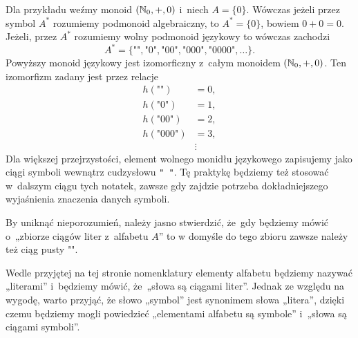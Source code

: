 \documentclass[a4paper,11pt]{article}
\begin{document}
Dla przykładu weźmy monoid $( \mathbb{N}_{ 0 }, +, 0)$ i~niech $A = \{ 0 \}$. Wówczas
jeżeli przez symbol $A^{ * }$ rozumiemy podmonoid algebraiczny, to $A^{ * } =
\{ 0 \}$, bowiem $0 + 0 = 0$. Jeżeli, przez $A^{ * }$ rozumiemy wolny podmonoid
językowy to wówczas zachodzi
\begin{equation}
  \label{eq:Forys-Forys-09}
  A^{ * } = \{ \textrm{""}, \textrm{"} 0 \textrm{"},
  \textrm{"} 00 \textrm{"}, \textrm{"} 000 \textrm{"},
  \textrm{"} 0000 \textrm{"}, \ldots \}.
\end{equation}
Powyższy monoid językowy jest izomorficzny z~całym monoidem
$( \mathbb{N}_{ 0 }, +, 0)$. Ten izomorfizm zadany jest przez relacje
\begin{subequations}
  \begin{align}
    \label{eq:Forys-Forys-10-A}
    h( \textrm{""} ) &= 0, \\
    h( \textrm{"} 0 \textrm{"} ) &= 1, \\
    h( \textrm{"} 0 0 \textrm{"} ) &= 2, \\
    h( \textrm{"} 0 0 0 \textrm{"} ) &= 3, \\
    &\vdots
  \end{align}
\end{subequations}
Dla większej przejrzystości, element wolnego monidłu językowego zapisujemy
jako ciągi symboli wewnątrz cudzysłowu \texttt{" "}. Tę praktykę będziemy
też stosować w~dalszym ciągu tych notatek, zawsze gdy zajdzie potrzeba
dokładniejszego wyjaśnienia znaczenia danych symboli.

\vspace{\spaceFour}



\start {} By uniknąć nieporozumień, należy jasno stwierdzić, że~gdy
będziemy mówić o~„zbiorze ciągów liter z~alfabetu $A$” to w domyśle do tego
zbioru zawsze należy też ciąg pusty \textrm{""}.

\vspace{\spaceFour}



\start {} Wedle przyjętej na tej stronie nomenklatury elementy
alfabetu będziemy nazywać „literami” i~będziemy mówić, że~„słowa są
ciągami liter”. Jednak ze względu na wygodę, warto przyjąć, że słowo
„symbol” jest synonimem słowa „litera”, dzięki czemu będziemy mogli
powiedzieć „elementami alfabetu są symbole” i~„słowa są ciągami
symboli”.

\vspace{\spaceFour}
\end{document}
